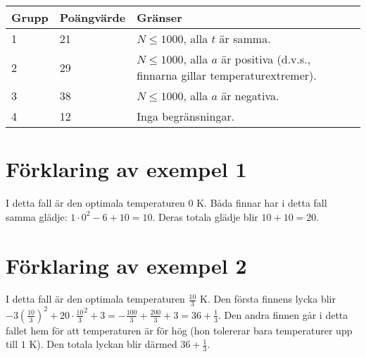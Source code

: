 \noindent
\begin{tabular}{| l | l | l |}
\hline
Grupp & Poängvärde & Gränser \\ \hline
1     & 21         & $N \le 1000$, alla $t$ är samma. \\ \hline
2     & 29         & $N \le 1000$, alla $a$ är positiva (d.v.s., finnarna gillar temperaturextremer). \\ \hline
3     & 38         & $N \le 1000$, alla $a$ är negativa. \\ \hline
4     & 12         & Inga begränsningar. \\ \hline
\end{tabular}

\section*{Förklaring av exempel 1}
I detta fall är den optimala temperaturen $0 \textrm{ K}$.
Båda finnar har i detta fall samma glädje: $1 \cdot 0^2 -6 + 10 = 10$.
Deras totala glädje blir $10 + 10 = 20$.

\section*{Förklaring av exempel 2}
I detta fall är den optimala temperaturen $\frac{10}{3} \textrm{ K}$.
Den första finnens lycka blir $-3(\frac{10}{3})^2 + 20 \cdot \frac{10}{3}^2 + 3 = -\frac{100}{3} + \frac{200}{3} + 3 = 36 + \frac{1}{3}$.
Den andra finnen går i detta fallet hem för att temperaturen är för hög (hon tolererar bara temperaturer upp till $1\textrm{ K}$).
Den totala lyckan blir därmed $36 + \frac{1}{3}$.
